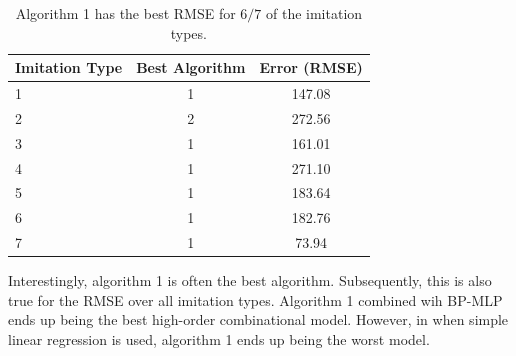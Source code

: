 \begin{table}[center]
	\centering
	\begin{center}
		\begin{tabular}{|l|c|c|} \hline
			\textbf{Imitation Type}	& \textbf{Best Algorithm}	&	\textbf{Error (RMSE)}	\\ \hline \hline
			1						& 1							&	147.08					\\ \hline
			2						& 2							&	272.56					\\ \hline
			3						& 1							&	161.01					\\ \hline
			4						& 1							&	271.10					\\ \hline
			5						& 1							&	183.64					\\ \hline
			6						& 1							&	182.76					\\ \hline
			7						& 1							&	73.94					\\ \hline
		\end{tabular}
	\end{center}
	\caption{Algorithm 1 has the best RMSE for $6/7$ of the imitation types.}
	\label{tab:best-for-each}
\end{table}

Interestingly, algorithm 1 is often the best algorithm. Subsequently, this is also true for the RMSE over all imitation types. Algorithm 1 combined wih BP-MLP ends up being the best high-order combinational model. However, in when simple linear regression is used, algorithm 1 ends up being the worst model.

